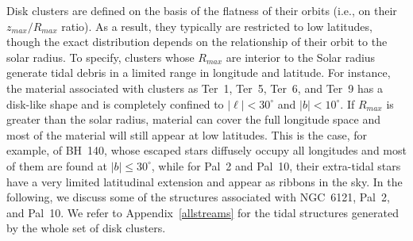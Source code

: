             Disk clusters are defined on the basis of the flatness of their orbits (i.e., on their $z_{max}/R_{max}$ ratio). As a result, they typically are restricted to low latitudes, though the exact distribution depends on the relationship of their orbit to the solar radius. To specify, clusters whose $R_{max}$ are interior to the Solar radius generate tidal debris in a limited range in longitude and latitude. For instance, the material associated with clusters as Ter~1, Ter~5, Ter~6, and Ter~9 has a disk-like shape and is completely confined to $|\ell| <30^{\circ}$ and $|b|<10^{\circ}$. If $R_{max}$ is greater than the solar radius, material can cover the full longitude space and most of the material will still appear at low latitudes. This is the case, for example, of BH~140, whose escaped stars diffusely occupy all longitudes and most of them are found at $|b| \le 30^\circ$, while for Pal~2 and Pal~10, their extra-tidal stars have a very limited latitudinal extension and appear as ribbons in the sky. In the following, we discuss some of the structures associated with NGC~6121, Pal~2, and Pal~10. We refer to Appendix~\ref{allstreams} for the tidal structures generated by the whole set of disk clusters.  

